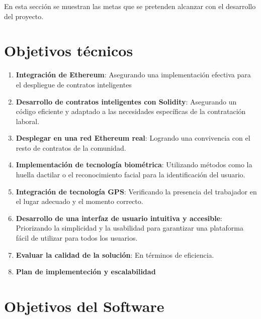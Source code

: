 
En esta sección se muestran las metas que se pretenden alcanzar con el desarrollo del proyecto.

\section*{Objetivos técnicos}

\begin{enumerate}

\item \textbf{Integración de Ethereum}: Asegurando una implementación efectiva para el despliegue de contratos inteligentes

\item \textbf{Desarrollo de contratos inteligentes con Solidity}: Asegurando un código eficiente y adaptado a las necesidades específicas de la contratación laboral. 

\item \textbf{Desplegar en una red Ethereum real}: Logrando una convivencia con el resto de contratos de la comunidad.

\item \textbf{Implementación de tecnología biométrica}: Utilizando métodos como la huella dactilar o el reconocimiento facial para la identificación del usuario.

\item \textbf{Integración de tecnología GPS}: Verificando la presencia del trabajador en el lugar adecuado y el momento correcto.

\item \textbf{Desarrollo de una interfaz de usuario intuitiva y accesible}: Priorizando la simplicidad y la usabilidad para garantizar una plataforma fácil de utilizar para todos los usuarios.

\item \textbf{Evaluar la calidad de la solución}: En términos de eficiencia.

\item \textbf{Plan de implementeción y escalabilidad}

\end{enumerate}


\section*{Objetivos del Software}

